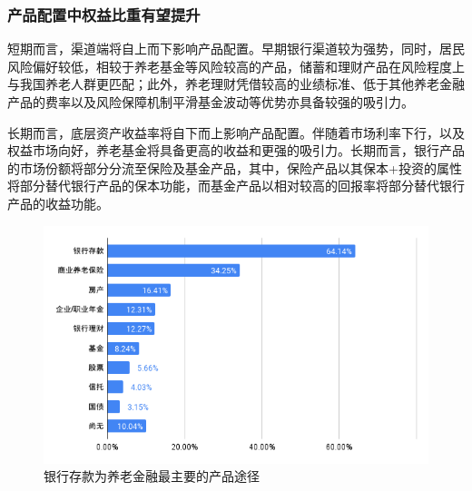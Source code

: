 \documentclass[a4paper,zihao=5]{ctexbeamer}
\begin{document}
\begin{frame}
    \frametitle{产品配置中权益比重有望提升}



    短期而言，渠道端将自上而下影响产品配置。早期银行渠道较为强势，同时，居民风险偏好较低，相较于养老基金等风险较高的产品，储蓄和理财产品在风险程度上与我国养老人群更匹配；此外，养老理财凭借较高的业绩标准、低于其他养老金融产品的费率以及风险保障机制平滑基金波动等优势亦具备较强的吸引力。

    长期而言，底层资产收益率将自下而上影响产品配置。伴随着市场利率下行，以及权益市场向好，养老基金将具备更高的收益和更强的吸引力。长期而言，银行产品的市场份额将部分分流至保险及基金产品，其中，保险产品以其保本+投资的属性将部分替代银行产品的保本功能，而基金产品以相对较高的回报率将部分替代银行产品的收益功能。
    \begin{figure}[H]
        \centering
        \includegraphics[width=0.5\linewidth]{img/chart.png}
        \caption{银行存款为养老金融最主要的产品途径}
    \end{figure}
\end{frame}


\end{document}

